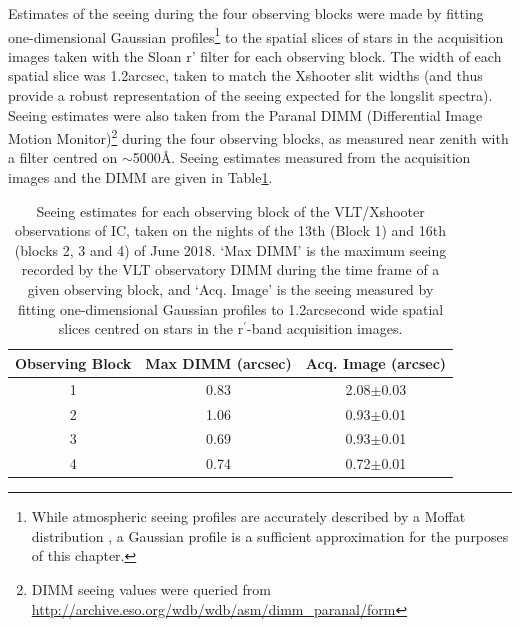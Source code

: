 Estimates of the seeing during the four observing blocks were made by fitting one-dimensional Gaussian profiles\footnote{While atmospheric seeing profiles are accurately described by a Moffat distribution \citep{Moffat1969}, a Gaussian profile is a sufficient approximation for the purposes of this chapter.} to the spatial slices of stars in the acquisition images taken with the Sloan r' filter for each observing block. The width of each spatial slice was 1.2\;arcsec, taken to match the Xshooter slit widths (and thus provide a robust representation of the seeing expected for the longslit spectra). Seeing estimates were also taken from the Paranal DIMM (Differential Image Motion Monitor)\footnote{DIMM seeing values were queried from \url{http://archive.eso.org/wdb/wdb/asm/dimm_paranal/form}} during the four observing blocks, as measured near zenith with a filter centred on $\sim$5000\;\AA. Seeing estimates measured from the acquisition images and the DIMM are given in Table\;\ref{tab: observations_and_data_reduction: xshooter_ic_5063: seeing: seeing}.

\begin{table}
    \centering
    {\renewcommand{\arraystretch}{2}
    \setlength{\tabcolsep}{20pt}
    \begin{tabular}{ccc}
    Observing Block & {Max DIMM (arcsec)} & Acq. Image (arcsec) \\ \hline
    1               & 0.83                                                         & 2.08$\pm$0.03                                                  \\
    2               & 1.06                                                         & 0.93$\pm$0.01                                           \\
    3               & 0.69                                                         & 0.93$\pm$0.01                                               \\
    4               & 0.74                                                         & 0.72$\pm$0.01                                              
    \end{tabular}
    }
    \caption[Seeing estimates for the VLT/Xshooter observations of IC.]{Seeing estimates for each observing block of the VLT/Xshooter observations of IC, taken on the nights of the 13th (Block 1) and 16th (blocks 2, 3 and 4) of June 2018. `Max DIMM' is the maximum seeing recorded by the VLT observatory DIMM during the time frame of a given observing block, and `Acq. Image' is the seeing measured by fitting one-dimensional Gaussian profiles to 1.2\;arcsecond wide spatial slices centred on stars in the r$^\prime$-band acquisition images.}
    \label{tab: observations_and_data_reduction: xshooter_ic_5063: seeing: seeing}
\end{table}

